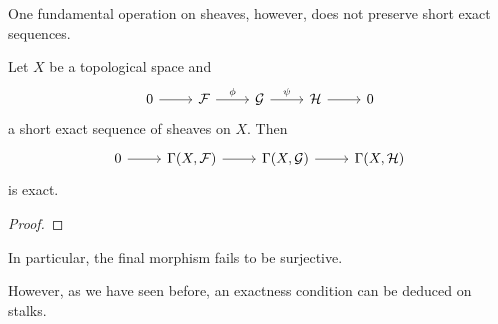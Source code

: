 One fundamental operation on sheaves, however, does not preserve short exact sequences. 
\begin{proposition}\label{prop: sections does not preserve exactness}
    Let $X$ be a topological space and 
    $$%
    \begin{tikzcd}
        0 & \Fcal & \Gcal & \Hcal & 0
        \arrow[from=1-1, to=1-2]
        \arrow["\phi", from=1-2, to=1-3]
        \arrow["\psi", from=1-3, to=1-4]
        \arrow[from=1-4, to=1-5]
    \end{tikzcd}$$
    a short exact sequence of sheaves on $X$. Then 
    $$%
    \begin{tikzcd}
        0 & {\Gamma(X,\Fcal)} & {\Gamma(X,\Gcal)} & {\Gamma(X,\Hcal)}
        \arrow[from=1-1, to=1-2]
        \arrow[from=1-2, to=1-3]
        \arrow[from=1-3, to=1-4]
    \end{tikzcd}$$
    is exact. 
\end{proposition}
\begin{proof}
\end{proof}
\begin{remark}
    In particular, the final morphism fails to be surjective. 
\end{remark}
However, as we have seen before, an exactness condition can be deduced on stalks. 
